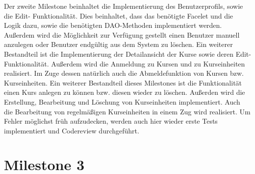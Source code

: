 Der zweite Milestone beinhaltet die Implementierung des Benutzerprofils, sowie die Edit-
Funktionalität. Dies beinhaltet, dass das benötigte Facelet und die Logik dazu, sowie die
benötigten DAO-Methoden implementiert werden.\\
Außerdem wird die Möglichkeit zur Verfügung gestellt einen Benutzer manuell anzulegen oder
Benutzer endgültig aus dem System zu löschen.
Ein weiterer Bestandteil ist die Implementierung der Detailansicht der Kurse sowie deren Edit-Funktionalität.
Außerdem wird die Anmeldung zu Kursen und zu Kurseinheiten realisiert. Im Zuge dessen natürlich auch die Abmeldefunktion von Kursen bzw. Kurseinheiten.
Ein weiterer Bestandteil dieses Milestones ist die Funktionalität einen Kurs anlegen zu können bzw. diesen wieder zu löschen. 
Außerden wird die Erstellung, Bearbeitung und Löschung von Kurseinheiten implementiert. Auch die Bearbeitung von regelmäßigen Kurseinheiten in einem Zug wird realisiert.
Um Fehler möglichst früh aufzudecken, werden auch hier wieder erste Tests implementiert
und Codereview durchgeführt.


\section{Milestone 3}